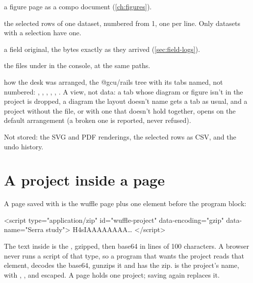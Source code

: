\begin{description}[style=nextline]
\item[\file{figures/<name>.compo.json}] a figure page as a compo document (\cref{ch:figures}).
\item[\file{selection/<dataset>.rows}] the selected rows of one dataset, numbered from 1, one per line.
Only datasets with a selection have one.
\item[\file{field/<name>/<log>.csv}, \file{<log>.csv.sig}, \file{photos/*.jpg}] a field original, the bytes
exactly as they arrived (\cref{sec:field-logs}).
\item[\file{home/…}] the files under  in the console, at the same paths.
\item[\file{layout.json}] how the desk was arranged, the @gcu/rails tree with its tabs named, not
numbered: , , , , ,
. A view, not data: a tab whose diagram or figure isn't in the project is dropped,
a diagram the layout doesn't name gets a tab as usual, and a project without the file, or with one that
doesn't hold together, opens on the default arrangement (a broken one is reported, never refused).
\end{description}

Not stored: the SVG and PDF renderings, the selected rows as CSV, and the undo history.

\section{A project inside a page}\label{sec:format-page}

A page saved with  is the wuffle page plus one
element before the program block:

\begin{codeblock}
<script type="application/zip" id="wuffle-project" data-encoding="gzip" data-name="Serra study">
H4sIAAAAAAAA…
</script>
\end{codeblock}

The text inside is the , gzipped, then base64 in lines of 100 characters. A browser never
runs a script of that type, so a program that wants the project reads that element, decodes the base64,
gunzips it and has the zip.  is the project's name, with \code{\&}, , \code{<} and
\code{>} escaped. A page holds one project; saving again replaces it.
